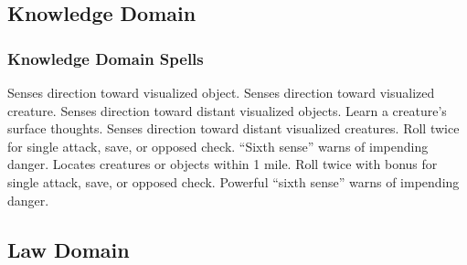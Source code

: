 \subsection{Knowledge Domain}
\subsubsection{Knowledge Domain Spells}
\begin{spelllist}
   Senses direction toward visualized object.
  \spellhead[1]{}
   Senses direction toward visualized creature.
  \spellhead[2]{}
   Senses direction toward distant visualized objects.
   Learn a creature's surface thoughts.
   Senses direction toward distant visualized creatures.
   Roll twice for single attack, save, or opposed check.
   ``Sixth sense'' warns of impending danger.
  \spellhead[5]{}
   Locates creatures or objects within 1 mile.
  \spellhead[7]{}
   Roll twice with bonus for single attack, save, or opposed check.
  \spellhead[8]{}
  \spellhead[8]{}
   Powerful ``sixth sense'' warns of impending danger.
\end{spelllist}

\subsection{Law Domain}

